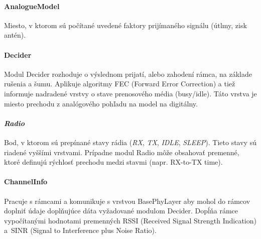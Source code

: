 \paragraph{AnalogueModel}
\indent Miesto, v ktorom sú počítané uvedené faktory prijímaného signálu (útlmy, zisk antén).
\paragraph{Decider}
\indent Modul \ttfamily Decider \rmfamily rozhoduje o výslednom prijatí, alebo zahodení rámca, na základe rušenia a šumu. Aplikuje algoritmy FEC (Forward Error Correction) a tiež informuje nadradené vrstvy o stave prenosového média (busy/idle). Táto vrstva je miesto prechodu z analógového pohľadu na model na digitálny.
\paragraph{\textit{Radio}}
\indent Bod, v ktorom sú prepínané stavy rádia (\textit{RX}, \textit{TX}, \textit{IDLE}, \textit{SLEEP}). Tieto stavy sú riadené vyššími vrstvami. Prípadne modul \ttfamily Radio \rmfamily môže obsahovať premenné, ktoré definujú rýchlosť prechodu medzi stavmi (napr. RX-to-TX time).
\paragraph{ChannelInfo}
\indent Pracuje s rámcami a komunikuje s vrstvou \ttfamily BasePhyLayer \rmfamily aby mohol do rámcov doplniť údaje doplňujúce dáta vyžadované modulom \ttfamily Decider\rmfamily. Dopĺňa rámce vypočítanými hodnotami premenných RSSI (Received Signal Strength Indication) a~SINR (Signal to Interference plus Noise Ratio).
